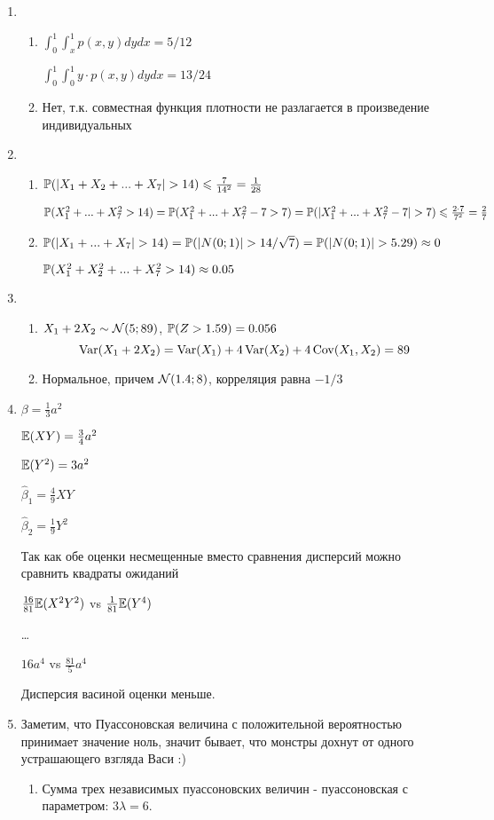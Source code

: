 \begin{enumerate}
\item
\begin{enumerate}
\item $\int_{0}^{1}\int_{x}^{1}p(x,y)dydx=5/12$

$\int_{0}^{1}\int_{0}^{1}y\cdot p(x,y)dydx=13/24$
\item Нет, т.к. совместная функция плотности не разлагается в произведение индивидуальных
\end{enumerate}
\item
\begin{enumerate}
\item $\P(|X_{1}+X_{2}+...+X_{7}|>14)\leq \frac{7}{14^2}=\frac{1}{28}$

$\P(X_{1}^{2}+...+X_{7}^{2}>14)=\P(X_{1}^{2}+...+X_{7}^{2}-7>7)=\P(|X_{1}^{2}+...+X_{7}^{2}-7|>7)\leq \frac{2\cdot 7}{7^2}=\frac{2}{7}$
\item $\P(|X_{1}+...+X_{7}|>14)=\P(|N(0;1)|>14/\sqrt{7})=\P(|N(0;1)|>5.29)\approx 0$

$\P(X_{1}^{2}+X_{2}^{2}+...+X_{7}^{2}>14)\approx 0.05$
\end{enumerate}
\item
\begin{enumerate}
\item $X_{1}+2X_{2}\sim \cN(5;89)$, $\P(Z>1.59)=0.056$
\[
\Var(X_1+2X_2)=\Var(X_1)+4\Var(X_2)+4\Cov(X_1,X_2)=89
\]
\item Нормальное, причем $\cN(1.4;8)$, корреляция равна $-1/3$
\end{enumerate}
\item $\beta=\frac{1}{3}a^{2}$

$\E(XY)=\frac{3}{4}a^{2}$

$\E(Y^{2})=3a^{2}$

$\hat{\beta}_{1}=\frac{4}{9}XY$

$\hat{\beta}_{2}=\frac{1}{9}Y^{2}$

Так как обе оценки несмещенные вместо сравнения дисперсий можно сравнить квадраты ожиданий

$\frac{16}{81}\E(X^{2}Y^{2})$ vs $\frac{1}{81}\E(Y^{4})$

\ldots

$16 a^4$ vs $\frac{81}{5} a^{4}$

Дисперсия васиной оценки меньше.
\item Заметим, что Пуассоновская величина с положительной вероятностью принимает значение ноль, значит бывает, что монстры дохнут от одного устрашающего взгляда Васи :)
\begin{enumerate}
\item Сумма трех независимых пуассоновских величин - пуассоновская с параметром: $3\lambda=6$.


\end{enumerate}
\end{enumerate}
